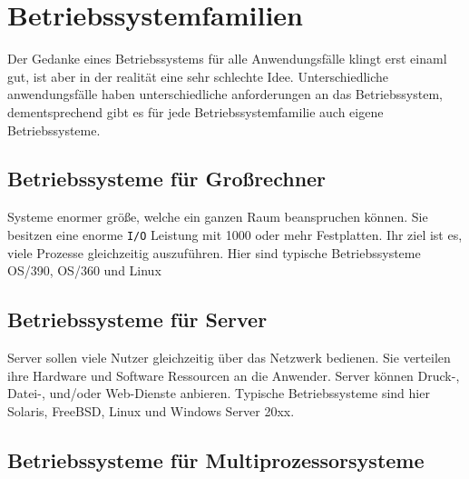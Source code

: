\section{Betriebssystemfamilien}

Der Gedanke eines Betriebssystems für alle Anwendungsfälle klingt erst einaml gut, ist aber in der realität eine sehr schlechte Idee. Unterschiedliche anwendungsfälle haben unterschiedliche anforderungen an das Betriebssystem, dementsprechend gibt es für jede Betriebssystemfamilie auch eigene Betriebssysteme.

\subsection{Betriebssysteme für Großrechner}

Systeme enormer größe, welche ein ganzen Raum beanspruchen können. Sie besitzen eine enorme \texttt{I/O} Leistung mit 1000 oder mehr Festplatten. Ihr ziel ist es, viele Prozesse gleichzeitig auszuführen. Hier sind typische Betriebssysteme OS/390, OS/360 und Linux

\subsection{Betriebssysteme für Server}

Server sollen viele Nutzer gleichzeitig über das Netzwerk bedienen. Sie verteilen ihre Hardware und Software Ressourcen an die Anwender. Server können Druck-, Datei-, und/oder Web-Dienste anbieren. Typische Betriebssysteme sind hier Solaris, FreeBSD, Linux und Windows Server 20xx.

\subsection{Betriebssysteme für Multiprozessorsysteme}

